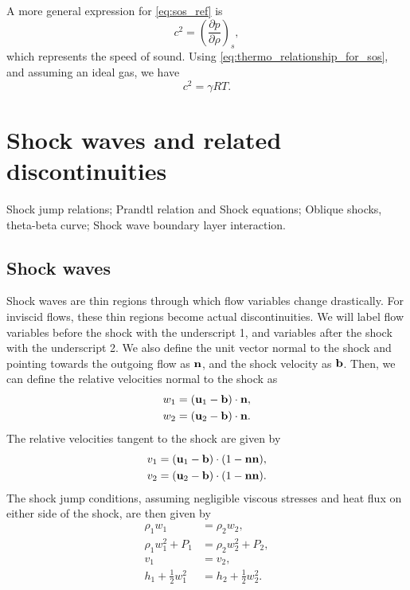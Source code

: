 \documentclass[oneside,a4paper,11pt]{report}
\begin{document}
A more general expression for \cref{eq:sos_ref} is
\begin{equation}
    c^2 = \left( \frac{\partial p}{\partial \rho} \right)_s,
\end{equation}
which represents the speed of sound. Using \cref{eq:thermo_relationship_for_sos}, and assuming an ideal gas, we have
\begin{equation}
    c^2 = \gamma R T.
\end{equation}

\chapter{Shock waves and related discontinuities}
Shock jump relations; Prandtl relation and Shock equations; Oblique shocks, theta-beta curve; Shock wave boundary layer interaction.

\section{Shock waves}
\label{sec:shock_waves}
Shock waves are thin regions through which flow variables change drastically. For inviscid flows, these thin regions become actual discontinuities. We will label flow variables before the shock with the underscript 1, and variables after the shock with the underscript 2. We also define the unit vector normal to the shock and pointing towards the outgoing flow as $\mathbf{n}$, and the shock velocity as $\mathbf{b}$. Then, we can define the relative velocities normal to the shock as 
\begin{align}
\label{eq:shock_rel_vel_normal}
    w_1 &= (\mathbf{u}_1 - \mathbf{b}) \cdot \mathbf{n}, \nonumber \\
    w_2 &= (\mathbf{u}_2 - \mathbf{b}) \cdot \mathbf{n}.
\end{align}
The relative velocities tangent to the shock are given by
\begin{align}
\label{eq:shock_rel_vel_tangential}
    v_1 &= (\mathbf{u}_1 - \mathbf{b}) \cdot (1 - \mathbf{n} \mathbf{n}), \nonumber \\
    v_2 &= (\mathbf{u}_2 - \mathbf{b}) \cdot (1 - \mathbf{n} \mathbf{n}).
\end{align}
The shock jump conditions, assuming negligible viscous stresses and heat flux on either side of the shock, are then given by
\begin{align}
    \rho_1 w_1 &= \rho_2 w_2, \label{eq:shock_jump_mass}\\
    \rho_1 w_1^2 + P_1 &= \rho_2 w_2^2 + P_2, \label{eq:shock_jump_vel1}\\
    v_1 &= v_2, \label{eq:shock_jump_vel2} \\
    h_1 + \frac{1}{2} w_1^2 &= h_2 + \frac{1}{2} w_2^2 \label{eq:shock_jump_energy}.
\end{align}
\end{document}
